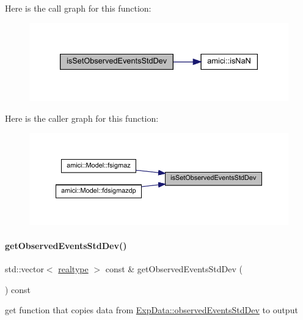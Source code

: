 Here is the call graph for this function\+:
\nopagebreak
\begin{figure}[H]
\begin{center}
\leavevmode
\includegraphics[width=333pt]{classamici_1_1_exp_data_a29530529cf50b9fa791e02fed620ea7a_cgraph}
\end{center}
\end{figure}
Here is the caller graph for this function\+:
\nopagebreak
\begin{figure}[H]
\begin{center}
\leavevmode
\includegraphics[width=350pt]{classamici_1_1_exp_data_a29530529cf50b9fa791e02fed620ea7a_icgraph}
\end{center}
\end{figure}
\mbox{\label{classamici_1_1_exp_data_a18cd150b527e08a9dd4a02b242a76d46}} 
\paragraph{\texorpdfstring{getObservedEventsStdDev()}{getObservedEventsStdDev()}}
{\footnotesize\ttfamily std\+::vector$<$ \mbox{\hyperlink{namespaceamici_a1bdce28051d6a53868f7ccbf5f2c14a3}{realtype}} $>$ const  \& get\+Observed\+Events\+Std\+Dev (\begin{DoxyParamCaption}{ }\end{DoxyParamCaption}) const}

get function that copies data from \mbox{\hyperlink{classamici_1_1_exp_data_abb12a8f75b4e6c936ae6c0be770628c9}{Exp\+Data\+::observed\+Events\+Std\+Dev}} to output

